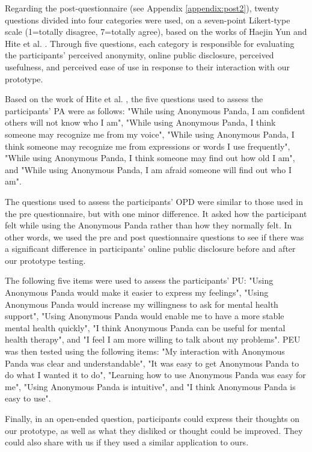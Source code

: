 Regarding the post-questionnaire (see Appendix \ref{appendix:post2}), twenty questions divided into four categories were used, on a seven-point Likert-type scale (1=totally disagree, 7=totally agree), based on the works of Haejin Yun \cite{YUN06} and Hite et al. \cite{HIT14}. Through five questions, each category is responsible for evaluating the participants' perceived anonymity, online public disclosure, perceived usefulness, and perceived ease of use in response to their interaction with our prototype.

Based on the work of Hite et al. \cite{HIT14}, the five questions used to assess the participants' PA were as follows: "While using Anonymous Panda, I am confident others will not know who I am", "While using Anonymous Panda, I think someone may recognize me from my voice", "While using Anonymous Panda, I think someone may recognize me from expressions or words I use frequently", "While using Anonymous Panda, I think someone may find out how old I am", and "While using Anonymous Panda, I am afraid someone will find out who I am". 

The questions used to assess the participants' OPD were similar to those used in the pre questionnaire, but with one minor difference. It asked how the participant felt while using the Anonymous Panda rather than how they normally felt. In other words, we used the pre and post questionnaire questions to see if there was a significant difference in participants' online public disclosure before and after our prototype testing.

The following five items were used to assess the participants' PU: "Using Anonymous Panda would make it easier to express my feelings", "Using Anonymous Panda would increase my willingness to ask for mental health support", "Using Anonymous Panda would enable me to have a more stable mental health quickly", "I think Anonymous Panda can be useful for mental health therapy", and "I feel I am more willing to talk about my problems". PEU was then tested using the following items: "My interaction with Anonymous Panda was clear and understandable", "It was easy to get Anonymous Panda to do what I wanted it to do", "Learning how to use Anonymous Panda was easy for me", "Using Anonymous Panda is intuitive", and "I think Anonymous Panda is easy to use".

Finally, in an open-ended question, participants could express their thoughts on our prototype, as well as what they disliked or thought could be improved. They could also share with us if they used a similar application to ours.

